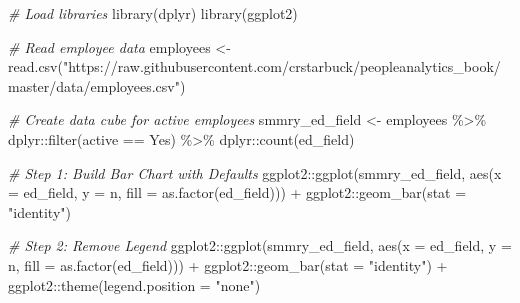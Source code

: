 \documentclass[
]{book}
\newenvironment{Shaded}{\begin{snugshade}}{\end{snugshade}}
\newcommand{\AttributeTok}[1]{\textcolor[rgb]{0.77,0.63,0.00}{#1}}
\newcommand{\CommentTok}[1]{\textcolor[rgb]{0.56,0.35,0.01}{\textit{#1}}}
\newcommand{\FunctionTok}[1]{\textcolor[rgb]{0.00,0.00,0.00}{#1}}
\newcommand{\NormalTok}[1]{#1}
\newcommand{\OtherTok}[1]{\textcolor[rgb]{0.56,0.35,0.01}{#1}}
\newcommand{\SpecialCharTok}[1]{\textcolor[rgb]{0.00,0.00,0.00}{#1}}
\newcommand{\StringTok}[1]{\textcolor[rgb]{0.31,0.60,0.02}{#1}}
\begin{document}
\begin{Shaded}
\begin{Highlighting}[]
\CommentTok{\# Load libraries}
\FunctionTok{library}\NormalTok{(dplyr)}
\FunctionTok{library}\NormalTok{(ggplot2)}

\CommentTok{\# Read employee data}
\NormalTok{employees }\OtherTok{\textless{}{-}} \FunctionTok{read.csv}\NormalTok{(}\StringTok{"https://raw.githubusercontent.com/crstarbuck/peopleanalytics\_book/master/data/employees.csv"}\NormalTok{)}

\CommentTok{\# Create data cube for active employees}
\NormalTok{smmry\_ed\_field }\OtherTok{\textless{}{-}}\NormalTok{ employees }\SpecialCharTok{\%\textgreater{}\%}
\NormalTok{                  dplyr}\SpecialCharTok{::}\FunctionTok{filter}\NormalTok{(active }\SpecialCharTok{==} \StringTok{\textquotesingle{}Yes\textquotesingle{}}\NormalTok{) }\SpecialCharTok{\%\textgreater{}\%}
\NormalTok{                  dplyr}\SpecialCharTok{::}\FunctionTok{count}\NormalTok{(ed\_field)}

\CommentTok{\# Step 1: Build Bar Chart with Defaults}
\NormalTok{ggplot2}\SpecialCharTok{::}\FunctionTok{ggplot}\NormalTok{(smmry\_ed\_field, }\FunctionTok{aes}\NormalTok{(}\AttributeTok{x =}\NormalTok{ ed\_field, }\AttributeTok{y =}\NormalTok{ n, }\AttributeTok{fill =} \FunctionTok{as.factor}\NormalTok{(ed\_field))) }\SpecialCharTok{+}
\NormalTok{ggplot2}\SpecialCharTok{::}\FunctionTok{geom\_bar}\NormalTok{(}\AttributeTok{stat =} \StringTok{"identity"}\NormalTok{) }

\CommentTok{\# Step 2: Remove Legend}
\NormalTok{ggplot2}\SpecialCharTok{::}\FunctionTok{ggplot}\NormalTok{(smmry\_ed\_field, }\FunctionTok{aes}\NormalTok{(}\AttributeTok{x =}\NormalTok{ ed\_field, }\AttributeTok{y =}\NormalTok{ n, }\AttributeTok{fill =} \FunctionTok{as.factor}\NormalTok{(ed\_field))) }\SpecialCharTok{+}
\NormalTok{ggplot2}\SpecialCharTok{::}\FunctionTok{geom\_bar}\NormalTok{(}\AttributeTok{stat =} \StringTok{"identity"}\NormalTok{) }\SpecialCharTok{+}
\NormalTok{ggplot2}\SpecialCharTok{::}\FunctionTok{theme}\NormalTok{(}\AttributeTok{legend.position =} \StringTok{"none"}\NormalTok{)}


\end{Highlighting}
\end{Shaded}
\end{document}
